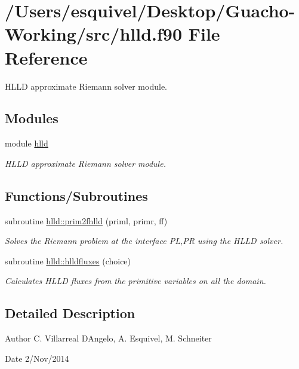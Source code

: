 \hypertarget{hlld_8f90}{}\section{/\+Users/esquivel/\+Desktop/\+Guacho-\/\+Working/src/hlld.f90 File Reference}
\label{hlld_8f90}


H\+L\+L\+D approximate Riemann solver module.  


\subsection*{Modules}
\begin{DoxyCompactItemize}
\item 
module \hyperlink{namespacehlld}{hlld}
\begin{DoxyCompactList}\small\item\em H\+L\+L\+D approximate Riemann solver module. \end{DoxyCompactList}\end{DoxyCompactItemize}
\subsection*{Functions/\+Subroutines}
\begin{DoxyCompactItemize}
\item 
subroutine \hyperlink{namespacehlld_adb0dbc5abe3e062f2ee4e333c6794bc8}{hlld\+::prim2fhlld} (priml, primr, ff)
\begin{DoxyCompactList}\small\item\em Solves the Riemann problem at the interface P\+L,P\+R using the H\+L\+L\+D solver. \end{DoxyCompactList}\item 
subroutine \hyperlink{namespacehlld_a2640822e1b56d5b174f6293c26d75e22}{hlld\+::hlldfluxes} (choice)
\begin{DoxyCompactList}\small\item\em Calculates H\+L\+L\+D fluxes from the primitive variables on all the domain. \end{DoxyCompactList}\end{DoxyCompactItemize}


\subsection{Detailed Description}
\begin{DoxyAuthor}{Author}
C. Villarreal D\textquotesingle{}Angelo, A. Esquivel, M. Schneiter 
\end{DoxyAuthor}
\begin{DoxyDate}{Date}
2/\+Nov/2014 
\end{DoxyDate}
